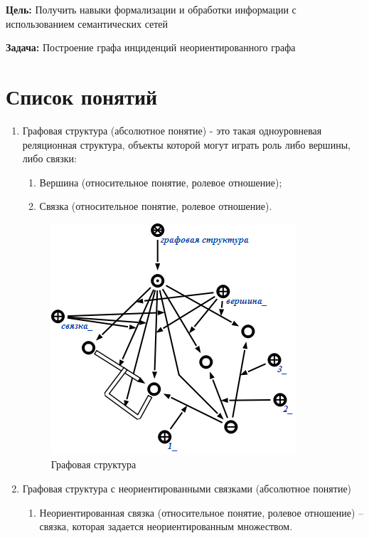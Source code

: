 \textbf{Цель: }Получить навыки формализации и обработки информации с
использованием семантических сетей

\textbf{Задача: }Построение графа инциденций неориентированного графа

\section{Список понятий}

\begin{enumerate}
\item
  Графовая структура (абсолютное понятие) - это такая одноуровневая
  реляционная структура, объекты которой могут играть роль либо вершины,
  либо связки:

  \begin{enumerate}
  \item
    Вершина (относительное понятие, ролевое отношение);
  \item
    Связка (относительное понятие, ролевое отношение).
  \end{enumerate}

\begin{figure}[H]
  \centering
  \includegraphics[scale=0.7]{images/1.png}
  \caption{Графовая структура}
\end{figure}

\item
  Графовая структура с неориентированными связками (абсолютное понятие)

  \begin{enumerate}
  \item
    Неориентированная связка (относительное понятие, ролевое отношение)
    --связка, которая задается неориентированным множеством.
  \end{enumerate}


\end{enumerate}
